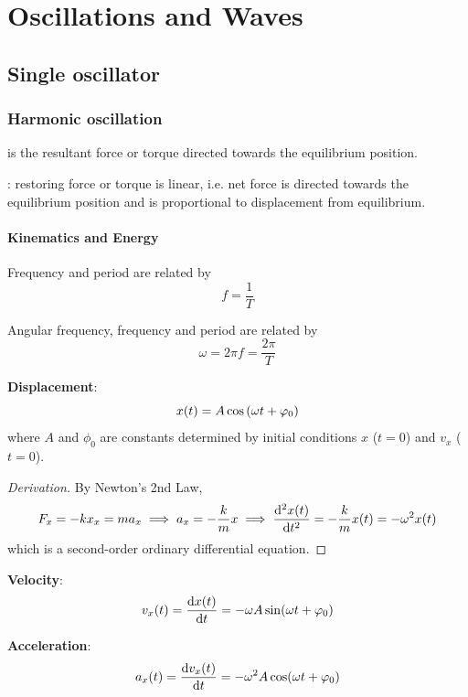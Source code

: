 \part{Oscillations and Waves}
\chapter{Single oscillator}
\section{Harmonic oscillation}
 is the resultant force or torque directed towards the equilibrium position.

: restoring force or torque is linear, i.e. net force is directed towards the equilibrium position and is proportional to displacement from equilibrium.

\subsection{Kinematics and Energy}
Frequency and period are related by
\begin{equation}
f=\frac{1}{T}
\end{equation}

Angular frequency, frequency and period are related by
\begin{equation}
\omega = 2\pi f = \frac{2\pi}{T}
\end{equation}

\textbf{Displacement}:
\begin{equation}
{x(t)=A\cos\left(\omega t+\varphi_0\right)
}\end{equation}
where $A$ and $\phi_0$ are constants determined by initial conditions $x$ ($t=0$) and $v_x$ ($t=0$).
\begin{proof}[Derivation]
By Newton's 2nd Law,
\[ F_x=-kx_x=ma_x \implies a_x=-\frac{k}{m}x \implies \dv[2]{x(t)}{t}=-\frac{k}{m}x(t)=-\omega^2x(t) \]
which is a second-order ordinary differential equation.
\end{proof}

\textbf{Velocity}:
\begin{equation}
{v_x(t)=\dv{x(t)}{t}=-\omega A\sin(\omega t+\varphi_0)
}\end{equation}

\textbf{Acceleration}:
\begin{equation}
{a_x(t)=\dv{v_x(t)}{t}=-\omega^2 A\cos(\omega t+\varphi_0)
}\end{equation}

